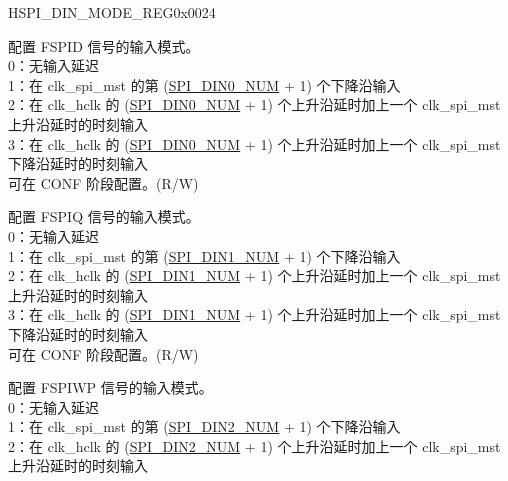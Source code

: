 \begin{register}{H}{SPI\_DIN\_MODE\_REG}{0x0024}\label{regdesc:SPIDINMODEREG}
%
%
%
%
%
%
%
%
%
%
\regnewline%
\begin{regdesc}\begin{reglist}
\label{fielddesc:SPIDIN0MODE}\item [SPI\_DIN0\_MODE] 配置 FSPID 信号的输入模式。\\
0：无输入延迟\\
1：在 clk\_spi\_mst 的第 (\hyperref[fielddesc:SPIDIN0NUM]{SPI\_DIN0\_NUM} + 1) 个下降沿输入\\
2：在 clk\_hclk 的 (\hyperref[fielddesc:SPIDIN0NUM]{SPI\_DIN0\_NUM} + 1) 个上升沿延时加上一个 clk\_spi\_mst 上升沿延时的时刻输入\\
3：在 clk\_hclk 的 (\hyperref[fielddesc:SPIDIN0NUM]{SPI\_DIN0\_NUM} + 1) 个上升沿延时加上一个 clk\_spi\_mst 下降沿延时的时刻输入\\
可在 CONF 阶段配置。(R/W)
\label{fielddesc:SPIDIN1MODE}\item [SPI\_DIN1\_MODE] 配置 FSPIQ 信号的输入模式。\\
0：无输入延迟\\
1：在 clk\_spi\_mst 的第 (\hyperref[fielddesc:SPIDIN1NUM]{SPI\_DIN1\_NUM} + 1) 个下降沿输入\\
2：在 clk\_hclk 的 (\hyperref[fielddesc:SPIDIN1NUM]{SPI\_DIN1\_NUM} + 1) 个上升沿延时加上一个 clk\_spi\_mst 上升沿延时的时刻输入\\
3：在 clk\_hclk 的 (\hyperref[fielddesc:SPIDIN1NUM]{SPI\_DIN1\_NUM} + 1) 个上升沿延时加上一个 clk\_spi\_mst 下降沿延时的时刻输入\\
可在 CONF 阶段配置。(R/W)
\label{fielddesc:SPIDIN2MODE}\item [SPI\_DIN2\_MODE] 配置 FSPIWP 信号的输入模式。\\
0：无输入延迟\\
1：在 clk\_spi\_mst 的第 (\hyperref[fielddesc:SPIDIN2NUM]{SPI\_DIN2\_NUM} + 1) 个下降沿输入\\
2：在 clk\_hclk 的 (\hyperref[fielddesc:SPIDIN2NUM]{SPI\_DIN2\_NUM} + 1) 个上升沿延时加上一个 clk\_spi\_mst 上升沿延时的时刻输入\\

\end{reglist}
\end{regdesc}
\end{register}
